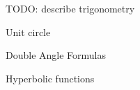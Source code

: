 \documentclass{article}
\begin{document}
TODO: describe trigonometry

Unit circle

Double Angle Formulas

Hyperbolic functions
\end{document}
